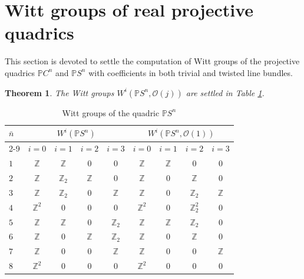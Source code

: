 \documentclass[psamsfonts]{amsart}
\theoremstyle{plain}
\newtheorem{theo}{Theorem}[section]
\theoremstyle{theorem}
\theoremstyle{definition}
\newcommand{\SO}{\mathcal{O}}
\newcommand{\Z}{\mathbb{Z}}
\newcommand{\W}{W}
\begin{document}
	\section{Witt groups of real projective quadrics}\label{sect:witt-quadric}
	This section is devoted to settle the computation of Witt groups of the projective quadrics $\mathbb{P}C^n$ and $\mathbb{P}S^n$ with coefficients in both trivial and twisted line bundles.
	\begin{theo}\label{thm:Psphere}
		The Witt groups $\W^i(\mathbb{P}S^n, \mathcal{O}(j))$ are settled in Table \ref{table:PSn_minus}. 
	\end{theo}
\begin{table}[H]
	\footnotesize \centering
	\renewcommand{\arraystretch}{1.5}
	\begin{tabular}{|l||c|c|c|c||c|c|c|c|}
		\hline
		\multirow{2}{*}{$\bar{n}$} & \multicolumn{4}{c||}{$\W^i(\mathbb{P}S^n)$} & \multicolumn{4}{c|}{$\W^i(\mathbb{P}S^n, \SO(1))$} \\
		\cline{2-9}
		& $i = 0$ & $i = 1$ & $i = 2$ & $i = 3$ & $i = 0$ & $i = 1$ & $i = 2$ & $i = 3$ \\
		\hline \hline
		$1$ & $\Z$ & $\Z$ & $0$ & $0$ & $\Z$ & $\Z$ & $0$ & $0$ \\
		\hline
		$2$ & $\Z$ & $\Z_2$ & $\Z$ & $0$ & $\Z$ & $0$ & $\Z$ & $0$ \\
		\hline
		$3$ & $\Z$ & $\Z_2$ & $0$ & $\Z$ & $\Z$ & $0$ & $\Z_2$ & $\Z$ \\
		\hline
		$4$ & $\Z^2$ & $0$ & $0$ & $0$ & $\Z^2$ & $0$ & $\Z_2^2$ & $0$ \\
		\hline
		$5$ & $\Z$ & $\Z$ & $0$ & $\Z_2$ & $\Z$ & $\Z$ & $\Z_2$ & $0$ \\
		\hline
		$6$ & $\Z$ & $0$ & $\Z$ & $\Z_2$ & $\Z$ & $0$ & $\Z$ & $0$ \\
		\hline
		$7$ & $\Z$ & $0$ & $0$ & $\Z$ & $\Z$ & $0$ & $0$ & $\Z$ \\
		\hline
		$8$ & $\Z^2$ & $0$ & $0$ & $0$ & $\Z^2$ & $0$ & $0$ & $0$ \\
		\hline
	\end{tabular}
	\caption{Witt groups of the quadric $\mathbb{P}S^n$}
	\label{table:PSn_minus}
\end{table}
\end{document}
